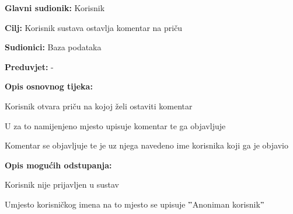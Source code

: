 						\noindent {}
					\begin{packed_item}
						
						\item \textbf{Glavni sudionik: }Korisnik
						\item  \textbf{Cilj:} Korisnik sustava ostavlja komentar na priču 
						\item  \textbf{Sudionici:} Baza podataka
						\item  \textbf{Preduvjet:} -
						\item  \textbf{Opis osnovnog tijeka:}
						
						\item[] \begin{packed_enum}
							\item Korisnik otvara priču na kojoj želi ostaviti komentar
							\item U za to namijenjeno mjesto upisuje komentar te ga objavljuje
							\item Komentar se objavljuje te je uz njega navedeno ime korisnika koji ga je objavio 
						\end{packed_enum}
						
						\item  \textbf{Opis mogućih odstupanja:}
						
						\item[] \begin{packed_item}
							
							\item[3.a] Korisnik nije prijavljen u sustav
							\item[] \begin{packed_enum}
								
								\item Umjesto korisničkog imena na to mjesto se upisuje $"$Anoniman korisnik$"$
								
							\end{packed_enum}						
						\end{packed_item}
					\end{packed_item}
				
